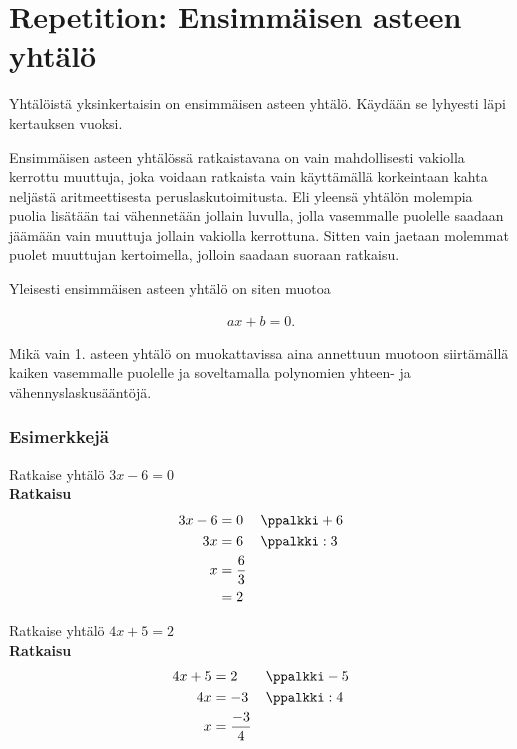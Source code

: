 \chapter{Repetition: Ensimmäisen asteen yhtälö}

Yhtälöistä yksinkertaisin on ensimmäisen asteen yhtälö. Käydään se lyhyesti
läpi kertauksen vuoksi.

Ensimmäisen asteen yhtälössä ratkaistavana on vain mahdollisesti vakiolla
kerrottu muuttuja, joka voidaan ratkaista vain käyttämällä korkeintaan
kahta neljästä aritmeettisesta peruslaskutoimitusta. Eli yleensä
yhtälön molempia puolia lisätään tai vähennetään jollain luvulla, jolla
vasemmalle puolelle saadaan jäämään vain muuttuja jollain vakiolla kerrottuna.
Sitten vain jaetaan molemmat puolet muuttujan kertoimella, jolloin saadaan
suoraan ratkaisu.


Yleisesti ensimmäisen asteen yhtälö on siten muotoa

\begin{align*}
    ax + b = 0.
\end{align*}

Mikä vain 1. asteen yhtälö on muokattavissa aina annettuun
muotoon siirtämällä kaiken vasemmalle puolelle ja
soveltamalla polynomien yhteen- ja vähennyslaskusääntöjä.

\subsection*{Esimerkkejä}

\begin{esimerkki}
Ratkaise yhtälö $3x - 6 = 0$ \\
\textbf{Ratkaisu} \\
  \begin{align*}
    3x - 6 &= 0 & \ppalkki & +6 \\
        3x &= 6 & \ppalkki & :3 \\
         x &= \frac{6}{3} \\
           &= 2
  \end{align*}
\end{esimerkki}

\begin{esimerkki}
Ratkaise yhtälö $4x + 5 = 2$ \\
\textbf{Ratkaisu}
\begin{align*}
    4x + 5 &= 2  & \ppalkki & -5 \\
        4x &= -3 & \ppalkki & :4 \\
         x &= \frac{-3}{4}
 \end{align*}
\end{esimerkki}

